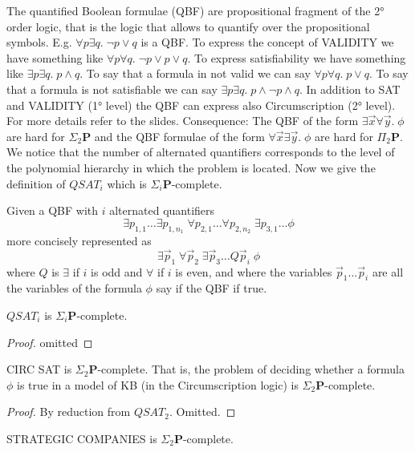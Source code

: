 The quantified Boolean formulae (QBF) are propositional fragment of the 2° order logic, that is the logic that allows to quantify over the propositional symbols. E.g. $\forall p \exists q.\; \neg p\lor q$ is a QBF. To express the concept of VALIDITY we have something like $\forall p\forall q.\;\neg p\lor p\lor q$. To express satisfiability we have something like $\exists p\exists q.\; p\land q$. To say that a formula in not valid we can say $\forall p\forall q.\; p\lor q$. To say that a formula is not satisfiable we can say $\exists p\exists q.\; p\land \neg p\land q$. In addition to SAT and VALIDITY (1° level) the QBF can express also Circumscription (2° level). For more details refer to the slides. Consequence: The QBF of the form $\exists \vec{x}\forall \vec{y}.\; \phi$ are hard for $\Sigma_2\mathbf{P}$ and the QBF formulae of the form $\forall \vec{x}\exists \vec{y}.\; \phi$ are hard for $\Pi_2\mathbf{P}$. We notice that the number of alternated quantifiers corresponds to the level of the polynomial hierarchy in which the problem is located. Now we give the definition of $QSAT_i$ which is $\Sigma_i\mathbf{P}$-complete.\\
\begin{defbox}[$QSAT_i$]
    Given a QBF with $i$ alternated quantifiers
    \[
\exists p_{1,1} \dots \exists p_{1,n_1} \; \forall p_{2,1} \dots \forall p_{2,n_2} \; \exists p_{3,1} \dots \phi
\]
 more concisely represented as
 \[
\exists \vec{p}_1 \; \forall \vec{p}_2 \; \exists \vec{p}_3 \dots Q \vec{p}_i \; \phi
\]
where $Q$ is $\exists$ if $i$ is odd and $\forall$ if $i$ is even, and where the variables $\vec{p}_1\dots\vec{p}_i$ are all the variables of the formula $\phi$ say if the QBF if true.
\end{defbox}
\begin{defbox}[Theorem]
    $QSAT_i$ is $\Sigma_i\mathbf{P}$-complete.
\end{defbox}
\begin{proof}
omitted
\end{proof}
\begin{defbox}[Theorem]
    CIRC SAT is $\Sigma_2\mathbf{P}$-complete. That is, the problem of deciding whether a formula $\phi$ is true in a model of KB (in the Circumscription logic) is $\Sigma_2\mathbf{P}$-complete.
\end{defbox}
\begin{proof}
    By reduction from $QSAT_2$. Omitted.
\end{proof}
\begin{defbox}
    STRATEGIC COMPANIES is $\Sigma_2\mathbf{P}$-complete.
\end{defbox}
